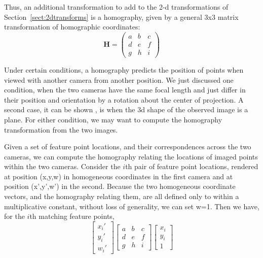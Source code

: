 Thus, an additional transformation to add to the 2-d transformations of Section~\ref{sect:2dtransforms} is a homography, given by a general 3x3 matrix transformation of homographic coordinates:
\begin{equation}
    \mathbf{H} =             
    \left (
    \begin{array}{ccc}
    a & b & c \\
    d & e & f \\
    g & h & i
    \end{array}
    \right )
\end{equation}


Under certain conditions, a homography predicts the position of points when viewed with another camera from another position. We just discussed one condition, when the two cameras have the same focal length and just differ in their position and orientation by a rotation about the center of projection.  A second case, it can be shown \cite{Hartley2004}, is when the 3d shape of the observed image is a plane.  For either condition, we may want to compute the homography transformation from the two images.  

Given a set of feature point locations, and their correspondences across the two cameras, we can compute the homography relating the locations of imaged points within the two cameras.  Consider the $i$th pair of feature point locations, rendered at position (x,y,w) in homogeneous coordinates in the first camera and at position (x',y',w') in the second.  Because the two homogeneous coordinate vectors, and the homography relating them, are all defined only to within a multiplicative constant, without loss of generality, we can set w=1.  Then we have, for the $i$th matching feature points,
\begin{equation}
              \left [
    \begin{array}{c}
    x_i' \\
    y_i' \\
    w_i' 
    \end{array}
    \right ]           
    \left [
    \begin{array}{ccc}
    a & b & c \\
    d & e & f \\
    g & h & i
    \end{array}
    \right ]
    \left [
    \begin{array}{c}
    x_i \\
    y_i \\
    1 
    \end{array}
        \right ] 
        \label{eq:homo1}
\end{equation}

